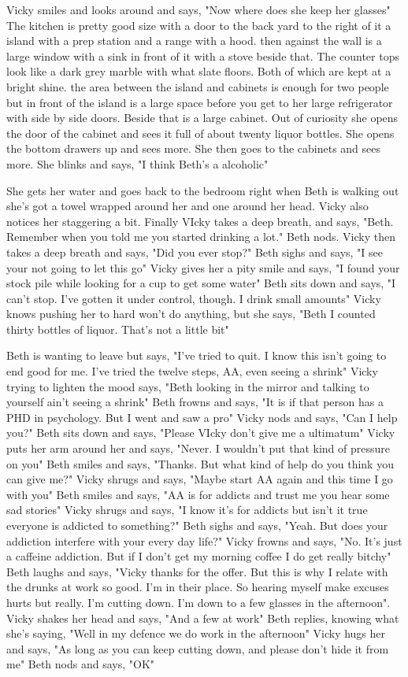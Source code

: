 \documentclass{article}[12px]
\begin{document}
    Vicky smiles and looks around and says, "Now where does she keep her glasses" The kitchen is pretty good size with a door to the back yard to the right of it a island with a prep station and a range with a hood. then against the wall is a large window with a sink in front of it with a stove beside that. The counter tops look like a dark grey marble with what slate floors. Both of which are kept at a bright shine. the area between the island and cabinets is enough for two people but in front of the island is a large space before you get to her large refrigerator with side by side doors. Beside that is a large cabinet. Out of curiosity she opens the door of the cabinet and sees it full of about twenty liquor bottles. She opens the bottom drawers up and sees more. She then goes to the cabinets and sees more. She blinks and says, "I think Beth's a alcoholic"

    She gets her water and goes back to the bedroom right when Beth is walking out she's got a towel wrapped around her and one around her head. Vicky also notices her staggering a bit. Finally VIcky takes a deep breath, and says, "Beth. Remember when you told me you started drinking a lot." Beth nods. Vicky then takes a deep breath and says, "Did you ever stop?" Beth sighs and says, "I see your not going to let this go" Vicky gives her a pity smile and says, "I found your stock pile while looking for a cup to get some water" Beth sits down and says, "I can't stop. I've gotten it under control, though. I drink small amounts" Vicky knows pushing her to hard won't do anything, but she says, "Beth I counted thirty bottles of liquor. That's not a little bit" 

    Beth is wanting to leave but says, "I've tried to quit. I know this isn't going to end good for me. I've tried the twelve steps, AA, even seeing a shrink" Vicky trying to lighten the mood says, "Beth looking in the mirror and talking to yourself ain't seeing a shrink" Beth frowns and says, "It is if that person has a PHD in psychology. But I went and saw a pro" Vicky nods and says, "Can I help you?" Beth sits down and says, "Please VIcky don't give me a ultimatum" Vicky puts her arm around her and says, "Never. I wouldn't put that kind of pressure on you" Beth smiles and says, "Thanks. But what kind of help do you think you can give me?" Vicky shrugs and says, "Maybe start AA again and this time I go with you" Beth smiles and says, "AA is for addicts and trust me you hear some sad stories" Vicky shrugs and says, "I know it's for addicts but isn't it true everyone is addicted to something?" Beth sighs and says, "Yeah. But does your addiction interfere with your every day life?" Vicky frowns and says, "No. It's just a caffeine addiction. But if I don't get my morning coffee I do get really bitchy" Beth laughs and says, "Vicky thanks for the offer. But this is why I relate with the drunks at work so good. I'm in their place. So hearing myself make excuses hurts but really. I'm cutting down. I'm down to a few glasses in the afternoon". Vicky shakes her head and says, "And a few at work" Beth replies, knowing what she's saying, "Well in my defence we do work in the afternoon" Vicky hugs her and says, "As long as you can keep cutting down, and please don't hide it from me" Beth nods and says, "OK"
\end{document}

